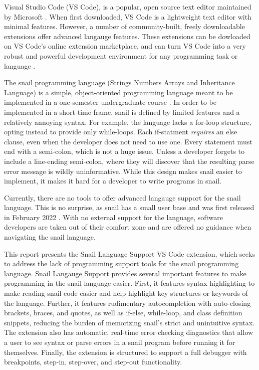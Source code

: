 \documentclass{article}
\begin{document}
Visual Studio Code (VS Code), is a popular, open source text editor maintained by Microsoft \cite{StackOverflow_2022,Microsoft_2023a}. When first downloaded, VS Code is a lightweight text editor with minimal features. However, a number of community-built, freely downloadable extensions offer advanced langauge features. These extensions can be dowloaded on VS Code's online extension marketplace, and can turn VS Code into a very robust and powerful development environment for any programming task or language \cite{Microsoft_2023b}. 

The snail programming language (Strings Numbers Arrays and Inheritance Language) is a simple, object-oriented programming language meant to be implemented in a one-semester undergraduate course \cite{Angstadt_2023a}. In order to be implemented in a short time frame, snail is defined by limited features and a relatively annoying syntax. For example, the language lacks a for-loop structure, opting instead to provide only while-loops. Each if-statment \emph{requires} an else clause, even when the developer does not need to use one. Every statement must end with a semi-colon, which is not a huge issue. Unless a developer forgets to include a line-ending semi-colon, where they will discover that the resulting parse error message is wildly uninformative. While this design makes snail easier to implement, it makes it hard for a developer to write programs in snail.

Currently, there are no tools to offer advanced langauge support for the snail language. This is no surprise, as snail has a small user base and was first released in February 2022 \cite{Angstadt_2023b}. With no external support for the language, software developers are taken out of their comfort zone and are offered no guidance when navigating the snail language.

This report presents the Snail Language Support VS Code extension, which seeks to address the lack of programming support tools for the snail programming language. Snail Langauge Support provides several important features to make programming in the snail language easier. First, it features syntax highlighting to make reading snail code easier and help highlight key structures or keywords of the language. Further, it features rudimentary autocompletion with auto-closing brackets, braces, and quotes, as well as if-else, while-loop, and class definition snippets, reducing the burden of memorizing snail's strict and unintuitive syntax. The extension also has automatic, real-time error checking diagnostics that allow a user to see syntax or parse errors in a snail program before running it for themselves. Finally, the extension is structured to support a full debugger with breakpoints, step-in, step-over, and step-out functionality. 
\end{document}
